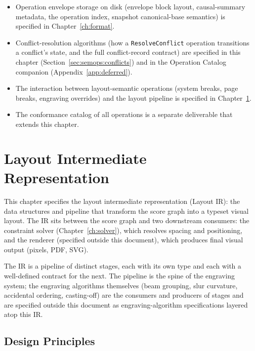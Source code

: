 \documentclass[11pt,letterpaper]{report}
\begin{document}
\begin{itemize}
  \item Operation envelope storage on disk (envelope block layout,
    causal-summary metadata, the operation index, snapshot
    canonical-base semantics) is specified in
    Chapter~\ref{ch:format}.
  \item Conflict-resolution algorithms (how a
    \texttt{ResolveConflict} operation transitions a conflict's
    state, and the full conflict-record contract) are specified
    in this chapter (Section~\ref{sec:semops:conflicts}) and in
    the Operation Catalog companion
    (Appendix~\ref{app:deferred}).
  \item The interaction between layout-semantic operations (system
    breaks, page breaks, engraving overrides) and the layout pipeline
    is specified in Chapter~\ref{ch:layout-ir}.
  \item The conformance catalog of all operations is a separate
    deliverable that extends this chapter.
\end{itemize}

\chapter{Layout Intermediate Representation}
\label{ch:layout-ir}

This chapter specifies the layout intermediate representation (Layout
IR): the data structures and pipeline that transform the score graph
into a typeset visual layout. The IR sits between the score graph and
two downstream consumers: the constraint solver
(Chapter~\ref{ch:solver}), which resolves spacing and positioning,
and the renderer (specified outside this document), which produces
final visual output (pixels, PDF, SVG).

The IR is a pipeline of distinct stages, each with its own type and
each with a well-defined contract for the next. The pipeline is the
spine of the engraving system; the engraving algorithms themselves
(beam grouping, slur curvature, accidental ordering, casting-off) are
the consumers and producers of stages and are specified outside this
document as engraving-algorithm specifications layered atop this IR.

\section{Design Principles}
\label{sec:layoutir:principles}
\end{document}

